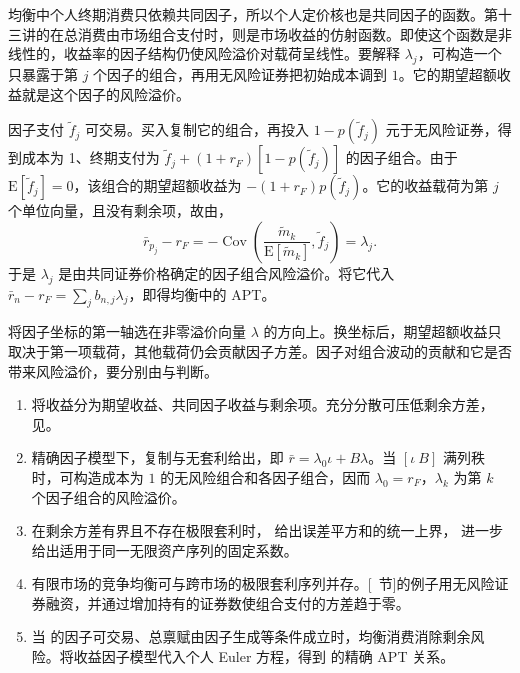 均衡中个人终期消费只依赖共同因子，所以个人定价核也是共同因子的函数。第十三讲的在总消费由市场组合支付时，则是市场收益的仿射函数。即使这个函数是非线性的，收益率的因子结构仍使风险溢价对载荷呈线性。要解释 $\lambda_j$，可构造一个只暴露于第 $j$ 个因子的组合，再用无风险证券把初始成本调到 $1$。它的期望超额收益就是这个因子的风险溢价。

\begin{solution}[label-content={证明（因子组合的风险溢价）},blank-type=none]
因子支付 $\widetilde f_j$ 可交易。买入复制它的组合，再投入 $1-p(\widetilde f_j)$ 元于无风险证券，得到成本为 1、终期支付为 $\widetilde f_j+(1+r_F)[1-p(\widetilde f_j)]$ 的因子组合。由于 $\mathrm E[\widetilde f_j]=0$，该组合的期望超额收益为 $-(1+r_F)p(\widetilde f_j)$。它的收益载荷为第 $j$ 个单位向量，且没有剩余项，故由，
\[
 \bar r_{p_j}-r_F
 =-\operatorname{Cov}\!\left(\frac{\widetilde m_k}{\mathrm E[\widetilde m_k]},\widetilde f_j\right)
 =\lambda_j.
\]
于是 $\lambda_j$ 是由共同证券价格确定的因子组合风险溢价。将它代入 $\bar r_n-r_F=\sum_j b_{n,j}\lambda_j$，即得均衡中的 APT。
\end{solution}

 将因子坐标的第一轴选在非零溢价向量 $\lambda$ 的方向上。换坐标后，期望超额收益只取决于第一项载荷，其他载荷仍会贡献因子方差。因子对组合波动的贡献和它是否带来风险溢价，要分别由与判断。

\WJChapterSummary
\begin{tcolorbox}[summary]
\begin{enumerate}
 \item {} 将收益分为期望收益、共同因子收益与剩余项。充分分散可压低剩余方差，见。
 \item 精确因子模型下，复制与无套利给出，即 $\bar r=\lambda_0\iota+B\lambda$。当 $[\iota\ B]$ 满列秩时，可构造成本为 $1$ 的无风险组合和各因子组合，因而 $\lambda_0=r_F$，$\lambda_k$ 为第 $k$ 个因子组合的风险溢价。
 \item 在剩余方差有界且不存在极限套利时， 给出误差平方和的统一上界， 进一步给出适用于同一无限资产序列的固定系数。
 \item 有限市场的竞争均衡可与跨市场的极限套利序列并存。[~节]的例子用无风险证券融资，并通过增加持有的证券数使组合支付的方差趋于零。
 \item 当 的因子可交易、总禀赋由因子生成等条件成立时，均衡消费消除剩余风险。将收益因子模型代入个人 Euler 方程，得到 的精确 APT 关系。
\end{enumerate}
\end{tcolorbox}

